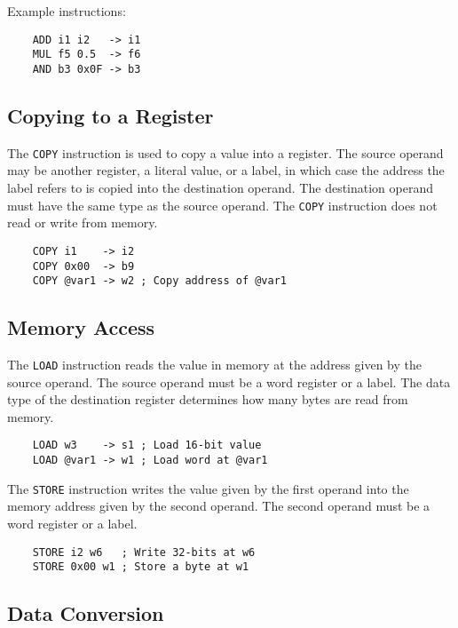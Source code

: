 Example instructions:

\begin{verbatim}
    ADD i1 i2   -> i1
    MUL f5 0.5  -> f6
    AND b3 0x0F -> b3
\end{verbatim}

\subsection{Copying to a Register}

The \texttt{COPY} instruction is used to copy a value into
a register. The source operand may be another register,
a literal value, or a label, in which case the address
the label refers to is copied into the destination operand.
The destination operand must have the same type as the source operand.
The \texttt{COPY} instruction does not read or write from memory.

\begin{verbatim}
    COPY i1    -> i2
    COPY 0x00  -> b9
    COPY @var1 -> w2 ; Copy address of @var1
\end{verbatim}

\subsection{Memory Access}

The \texttt{LOAD} instruction reads the value in memory
at the address given by the source operand. The source operand
must be a word register or a label. The data type of the
destination register determines how many bytes are read from memory.

\begin{verbatim}
    LOAD w3    -> s1 ; Load 16-bit value
    LOAD @var1 -> w1 ; Load word at @var1
\end{verbatim}

The \texttt{STORE} instruction writes the value given by
the first operand into the memory address given by the
second operand. The second operand must be a word register
or a label.

\begin{verbatim}
    STORE i2 w6   ; Write 32-bits at w6
    STORE 0x00 w1 ; Store a byte at w1
\end{verbatim}

\subsection{Data Conversion}

